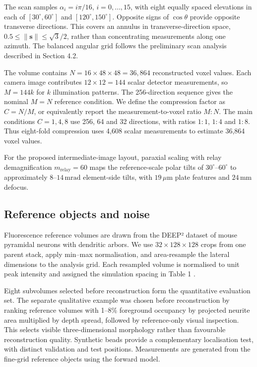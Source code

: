 The scan samples \(\alpha_i=i\pi/16\), \(i=0,\ldots,15\), with eight equally spaced elevations in each of \([30^\circ,60^\circ]\) and \([120^\circ,150^\circ]\). Opposite signs of \(\cos\theta\) provide opposite transverse directions. This covers an annulus in transverse-direction space, \(0.5\leq\|\mathbf s\|\leq\sqrt{3}/2\), rather than concentrating measurements along one azimuth. The balanced angular grid follows the preliminary scan analysis described in Section 4.2.

The volume contains \(N=16\times48\times48=36{,}864\) reconstructed voxel values. Each camera image contributes \(12\times12=144\) scalar detector measurements, so \(M=144k\) for \(k\) illumination patterns. The 256-direction sequence gives the nominal \(M=N\) reference condition. We define the compression factor as \(C=N/M\), or equivalently report the measurement-to-voxel ratio \(M:N\). The main conditions \(C=1,4,8\) use 256, 64 and 32 directions, with ratios \(1:1\), \(1:4\) and \(1:8\). Thus eight-fold compression uses 4,608 scalar measurements to estimate 36,864 voxel values.

For the proposed intermediate-image layout, paraxial scaling with relay demagnification \(m_{\mathrm{relay}}=60\) maps the reference-scale polar tilts of \(30^\circ\)--\(60^\circ\) to approximately \(8\)--\(14\,\mathrm{mrad}\) element-side tilts, with \(19\,\mu\mathrm m\) plate features and \(24\,\mathrm{mm}\) defocus.

\subsection{Reference objects and noise}

Fluorescence reference volumes are drawn from the DEEP² dataset of mouse pyramidal neurons with dendritic arbors. We use \(32\times128\times128\) crops from one parent stack, apply min--max normalisation, and area-resample the lateral dimensions to the analysis grid. Each resampled volume is normalised to unit peak intensity and assigned the simulation spacing in Table 1 \cite{wijethilake2023}.

Eight subvolumes selected before reconstruction form the quantitative evaluation set. The separate qualitative example was chosen before reconstruction by ranking reference volumes with 1--8\% foreground occupancy by projected neurite area multiplied by depth spread, followed by reference-only visual inspection. This selects visible three-dimensional morphology rather than favourable reconstruction quality. Synthetic beads provide a complementary localisation test, with distinct validation and test positions. Measurements are generated from the fine-grid reference objects using the forward model.

